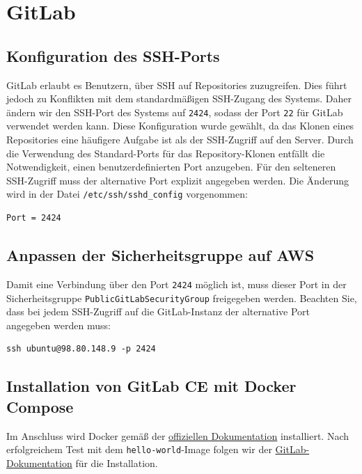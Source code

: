 \documentclass[a4paper,12pt]{article}
\begin{document}
\newpage

\section{GitLab}

\subsection{Konfiguration des SSH-Ports}
GitLab erlaubt es Benutzern, über SSH auf Repositories zuzugreifen. Dies führt jedoch zu Konflikten mit dem standardmäßigen SSH-Zugang des Systems. Daher ändern wir den SSH-Port des Systems auf \texttt{2424}, sodass der Port \texttt{22} für GitLab verwendet werden kann.
Diese Konfiguration wurde gewählt, da das Klonen eines Repositories eine häufigere Aufgabe ist als der SSH-Zugriff auf den Server. Durch die Verwendung des Standard-Ports für das Repository-Klonen entfällt die Notwendigkeit, einen benutzerdefinierten Port anzugeben. Für den selteneren SSH-Zugriff muss der alternative Port explizit angegeben werden.
Die Änderung wird in der Datei \texttt{/etc/ssh/sshd\_config} vorgenommen:

\begin{verbatim}
Port = 2424
\end{verbatim}

\subsection{Anpassen der Sicherheitsgruppe auf AWS}
Damit eine Verbindung über den Port \texttt{2424} möglich ist, muss dieser Port in der Sicherheitsgruppe \texttt{PublicGitLabSecurityGroup} freigegeben werden. Beachten Sie, dass bei jedem SSH-Zugriff auf die GitLab-Instanz der alternative Port angegeben werden muss:

\begin{verbatim}
ssh ubuntu@98.80.148.9 -p 2424
\end{verbatim}

\subsection{Installation von GitLab CE mit Docker Compose}

Im Anschluss wird Docker gemäß der \href{https://docs.docker.com/engine/install/ubuntu/}{offiziellen Dokumentation} installiert. Nach erfolgreichem Test mit dem \texttt{hello-world}-Image folgen wir der \href{https://docs.gitlab.com/ee/install/docker/installation.html}{GitLab-Dokumentation} für die Installation.
\end{document}
